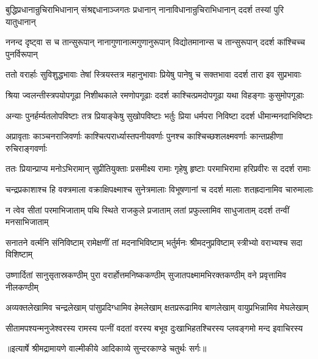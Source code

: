 \fourlineindentedshloka
{बुद्धिप्रधानान्रुचिराभिधानान्}
{संश्रद्दधानाञ्जगतः प्रधानान्}
{नानाविधानान्रुचिराभिधानान्}
{ददर्श तस्यां पुरि यातुधानान्} %

\fourlineindentedshloka
{ननन्द दृष्ट्वा स च तान्सुरूपान्}
{नानागुणानात्मगुणानुरूपान्}
{विद्योतमानान्स च तान्सुरूपान्}
{ददर्श कांश्चिच्च पुनर्विरूपान्} %

\fourlineindentedshloka
{ततो वरार्हाः सुविशुद्धभावाः}
{तेषां स्त्रियस्तत्र महानुभावाः}
{प्रियेषु पानेषु च सक्तभावा}
{ददर्श तारा इव सुप्रभावाः} %

\fourlineindentedshloka
{श्रिया ज्वलन्तीस्त्रपयोपगूढा}
{निशीथकाले रमणोपगूढाः}
{ददर्श काश्चित्प्रमदोपगूढा}
{यथा विहङ्गाः कुसुमोपगूडाः} %

\fourlineindentedshloka
{अन्याः पुनर्हर्म्यतलोपविष्टाः}
{तत्र प्रियाङ्केषु सुखोपविष्टाः}
{भर्तुः प्रिया धर्मपरा निविष्टा}
{ददर्श धीमान्मनदाभिविष्टाः} %

\fourlineindentedshloka
{अप्रावृताः काञ्चनराजिवर्णाः}
{काश्चित्परार्ध्यास्तपनीयवर्णाः}
{पुनश्च काश्चिच्छशलक्ष्मवर्णाः}
{कान्तप्रहीणा रुचिराङ्गवर्णाः} %

\fourlineindentedshloka
{ततः प्रियान्प्राप्य मनोऽभिरामान्}
{सुप्रीतियुक्ताः प्रसमीक्ष्य रामाः}
{गृहेषु हृष्टाः परमाभिरामा}
{हरिप्रवीरः स ददर्श रामाः} %

\fourlineindentedshloka
{चन्द्रप्रकाशाश्च हि वक्त्रमाला}
{वक्राक्षिपक्ष्माश्च सुनेत्रमालाः}
{विभूषणानां च ददर्श मालाः}
{शतह्रदानामिव चारुमालाः} %

\fourlineindentedshloka
{न त्वेव सीतां परमाभिजाताम्}
{पथि स्थिते राजकुले प्रजाताम्}
{लतां प्रफुल्लामिव साधुजाताम्}
{ददर्श तन्वीं मनसाभिजाताम्} %

\fourlineindentedshloka
{सनातने वर्त्मनि संनिविष्टाम्}
{रामेक्षणीं तां मदनाभिविष्टाम्}
{भर्तुर्मनः श्रीमदनुप्रविष्टाम्}
{स्त्रीभ्यो वराभ्यश्च सदा विशिष्टाम्} %

\fourlineindentedshloka
{उष्णार्दितां सानुसृतास्रकण्ठीम्}
{पुरा वरार्होत्तमनिष्ककण्ठीम्}
{सुजातपक्ष्मामभिरक्तकण्ठीम्}
{वने प्रवृत्तामिव नीलकण्ठीम्} %

\fourlineindentedshloka
{अव्यक्तलेखामिव चन्द्रलेखाम्}
{पांसुप्रदिग्धामिव हेमलेखाम्}
{क्षतप्ररूढामिव बाणलेखाम्}
{वायुप्रभिन्नामिव मेघलेखाम्} %

\fourlineindentedshloka
{सीतामपश्यन्मनुजेश्वरस्य}
{रामस्य पत्नीं वदतां वरस्य}
{बभूव दुःखाभिहतश्चिरस्य}
{प्लवङ्गमो मन्द इवाचिरस्य} %


{॥इत्यार्षे श्रीमद्रामायणे वाल्मीकीये आदिकाव्ये सुन्दरकाण्डे चतुर्थः सर्गः॥}

